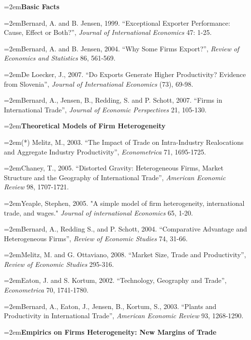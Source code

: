 \documentclass[10pt]{article}
\newcommand{\reading}{\par\hangindent=2em\hangafter=1\noindent}
\newenvironment{readingsblock}{%
  \begin{adjustwidth}{2em}{0pt} %
}{%
  \end{adjustwidth}
}
\begin{document}
  \begin{readingsblock}

  \reading \textbf{Basic Facts} \\[4pt]
  
  \reading Bernard, A. and B. Jensen, 1999. “Exceptional Exporter Performance: Cause, Effect or Both?”, {\it Journal of International Economics} 47: 1-25.
  
  \reading Bernard, A. and B. Jensen, 2004. “Why Some Firms Export?”, {\it Review of Economics and Statistics} 86, 561-569.
  
  \reading De Loecker, J., 2007. “Do Exports Generate Higher Productivity? Evidence from Slovenia”, {\it Journal of International Economics} (73), 69-98.
  
  \reading Bernard, A., Jensen, B., Redding, S. and P. Schott, 2007. “Firms in International Trade”, {\it Journal of Economic Perspectives} 21, 105-130. \\[4pt]
  
  \reading \textbf{Theoretical Models of Firm Heterogeneity} \\[4pt]
  
  \reading (*) Melitz, M., 2003. “The Impact of Trade on Intra-Industry Realocations and Aggregate Industry Productivity”, {\it Econometrica} 71, 1695-1725.
  
  \reading Chaney, T., 2005. “Distorted Gravity: Heterogeneous Firms, Market Structure and the Geography of International Trade”, {\it American Economic Review} 98, 1707-1721.
  
  \reading Yeaple, Stephen, 2005. "A simple model of firm heterogeneity, international trade, and wages." {\it Journal of international Economics} 65, 1-20.
  
  \reading Bernard, A., Redding S., and P. Schott, 2004. “Comparative Advantage and Heterogeneous Firms”, {\it Review of Economic Studies} 74, 31-66.
  
  \reading Melitz, M. and G. Ottaviano, 2008. “Market Size, Trade and Productivity”, {\it Review of Economic Studies} 295-316.
  
  \reading Eaton, J. and S. Kortum, 2002. “Technology, Geography and Trade”, {\it Econometrica} 70, 1741-1780.
  
  \reading Bernard, A., Eaton, J., Jensen, B., Kortum, S., 2003. “Plants and Productivity in International Trade”, {\it American Economic Review} 93, 1268-1290. \\[4pt]
  
  
  \reading \textbf{Empirics on Firms Heterogeneity: New Margins of Trade} \\[4pt]
  

\end{readingsblock}
\end{document}
